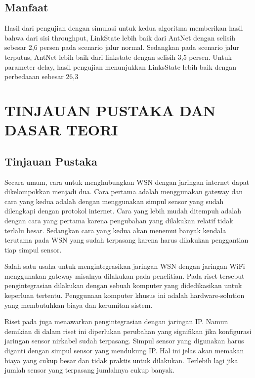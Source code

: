 \documentclass{jtetiproposalskripsi}
\begin{document}
\section{Manfaat}
Hasil  dari  pengujian  dengan  simulasi  untuk  kedua algoritma  memberikan  hasil  bahwa  dari  sisi throughput, LinkState lebih baik dari AntNet dengan selisih  sebesar  2,6 persen  pada  scenario  jalur  normal. Sedangkan  pada  scenario  jalur  terputus,  AntNet lebih baik dari  linkstate dengan selisih 3,5 persen. Untuk parameter  delay,  hasil  pengujian  menunjukkan LinksState  lebih  baik  dengan  perbedaaan  sebesar 26,3

\chapter{TINJAUAN PUSTAKA DAN DASAR TEORI}                

\section{Tinjauan Pustaka}
Secara umum, cara untuk menghubungkan WSN dengan jaringan internet dapat dikelompokkan menjadi dua. Cara pertama adalah menggunakan gateway dan cara yang kedua adalah dengan menggunakan simpul sensor yang sudah dilengkapi dengan protokol internet. Cara yang lebih mudah ditempuh adalah dengan cara yang pertama karena pengubahan yang dilakukan relatif tidak terlalu besar. Sedangkan cara yang kedua akan menemui banyak kendala terutama pada WSN yang sudah terpasang karena harus dilakukan penggantian tiap simpul sensor.

Salah satu usaha untuk mengintegrasikan jaringan WSN dengan jaringan WiFi menggunakan gateway misalnya dilakukan pada penelitian. Pada riset tersebut pengintegrasian dilakukan dengan sebuah komputer yang didedikasikan untuk keperluan tertentu. Penggunaan komputer khusus ini adalah hardware-solution yang membutuhkan biaya dan kerumitan sistem.

Riset pada juga menawarkan pengintegrasian dengan jaringan IP. Namun demikian di dalam riset ini diperlukan perubahan yang signifikan jika konfigurasi jaringan sensor nirkabel sudah terpasang. Simpul sensor yang digunakan harus diganti dengan simpul sensor yang mendukung IP. Hal ini jelas akan memakan biaya yang cukup besar dan tidak praktis untuk dilakukan. Terlebih lagi jika jumlah sensor yang terpasang jumlahnya cukup banyak.
\end{document}
